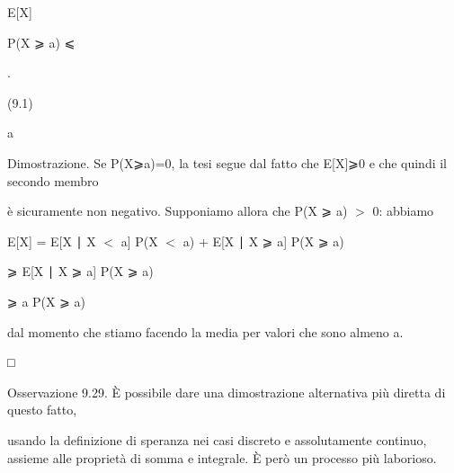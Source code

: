 \documentclass[a4paper,portrait,12pt]{article}
\begin{document}
\begin{flushleft}
E[X]
\end{flushleft}


\begin{flushleft}
P(X ⩾ a) ⩽
\end{flushleft}


.


(9.1)


\begin{flushleft}
a
\end{flushleft}


\begin{flushleft}
Dimostrazione. Se P(X⩾a)=0, la tesi segue dal fatto che E[X]⩾0 e che quindi il secondo membro
\end{flushleft}


\begin{flushleft}
\`{e} sicuramente non negativo. Supponiamo allora che P(X ⩾ a) $>$ 0: abbiamo
\end{flushleft}


\begin{flushleft}
E[X] = E[X ∣ X $<$ a] P(X $<$ a) + E[X ∣ X ⩾ a] P(X ⩾ a)
\end{flushleft}


\begin{flushleft}
⩾ E[X ∣ X ⩾ a] P(X ⩾ a)
\end{flushleft}


\begin{flushleft}
⩾ a P(X ⩾ a)
\end{flushleft}


\begin{flushleft}
dal momento che stiamo facendo la media per valori che sono almeno a.
\end{flushleft}





□





\begin{flushleft}
Osservazione 9.29. \`{E} possibile dare una dimostrazione alternativa più diretta di questo fatto,
\end{flushleft}


\begin{flushleft}
usando la definizione di speranza nei casi discreto e assolutamente continuo, assieme alle propriet\`{a} di somma e integrale. \`{E} per\`{o} un processo più laborioso.
\end{flushleft}
\end{document}
